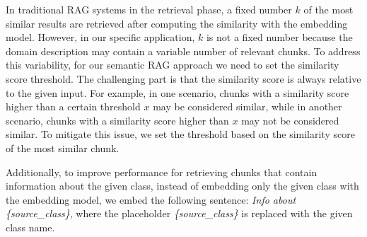 In traditional RAG systems in the retrieval phase, a fixed number $k$ of the most similar results are retrieved after computing the similarity with the embedding model. However, in our specific application, $k$ is not a fixed number because the domain description may contain a variable number of relevant chunks. To address this variability, for our semantic RAG approach we need to set the similarity score threshold. The challenging part is that the similarity score is always relative to the given input. For example, in one scenario, chunks with a similarity score higher than a certain threshold $x$ may be considered similar, while in another scenario, chunks with a similarity score higher than $x$ may not be considered similar. To mitigate this issue, we set the threshold based on the similarity score of the most similar chunk.

Additionally, to improve performance for retrieving chunks that contain information about the given class, instead of embedding only the given class with the embedding model, we embed the following sentence: \textit{Info about \{source\_class\}}, where the placeholder \textit{\{source\_class\}} is replaced with the given class name.


